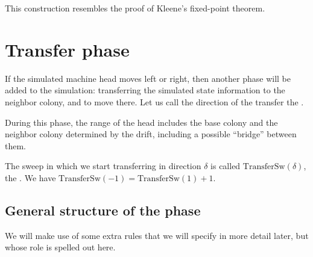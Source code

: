 \documentclass[12pt]{memoir}
\newcommand{\TransferSw}{\mathrm{TransferSw}}
\begin{document}
\begin{remark}
This construction resembles the proof of Kleene's fixed-point theorem.
\end{remark}



\section{Transfer phase}\label{sec:TransferPhase}

If the simulated machine head moves left or right, then another phase will
be added to the simulation: transferring the simulated state information to the
neighbor colony, and to move there.
Let us call the direction of the transfer the .

During this phase, the range of the head
includes the base colony and the neighbor colony
determined by the drift, including a possible ``bridge'' between them.

The sweep in which we start transferring in direction \( \delta \) is called
\( \TransferSw(\delta) \), the .
We have \( \TransferSw(-1) =\TransferSw(1)+1 \).

\subsection{General structure of the phase}\label{sec:TransferPhase.general-struc}

We will make use of some extra rules that we will
specify in more detail later, but whose role is spelled out here.
\end{document}
